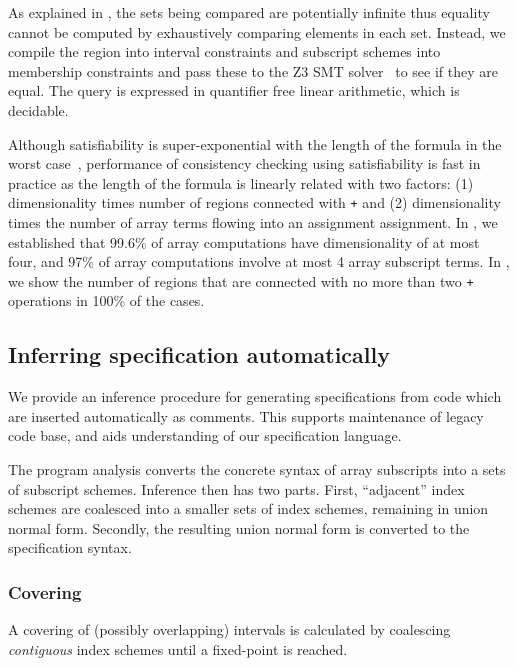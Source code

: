 As explained in , the sets being compared are
potentially infinite thus equality cannot be computed by exhaustively
comparing elements in each set. Instead, we compile the region into
interval constraints and subscript schemes into membership constraints and pass
these to the \textsc{Z3} SMT solver~\citep{de2008z3} to see if they are equal. The
query is expressed in quantifier free linear arithmetic, which is decidable.

Although satisfiability is super-exponential with the length of the formula in
the worst case~\cite{fischer1974super}, performance of consistency checking
using satisfiability is fast in practice as the length of the formula is linearly
related with two factors: (1) dimensionality times number of regions connected
with \texttt{+} and (2) dimensionality times the number of array terms flowing
into an assignment assignment. In , we
established that  99.6\% of array computations have 
dimensionality of at most four, and 97\% of array computations
involve at most 4 array subscript terms. In
, we show the number of regions that are
connected with no more than two \texttt{+} operations in 100\% of the cases.


\subsection{Inferring specification automatically}
\label{subsec:inference}
%
\noindent
We provide an inference procedure for generating specifications from
code which are inserted automatically as comments. This supports
maintenance of legacy code base, and aids understanding of our
specification language. 

The program analysis converts the concrete syntax of
array subscripts into a sets of subscript schemes. Inference then has
two parts. First, ``adjacent'' index schemes are coalesced into a
smaller sets of index schemes, remaining in union normal
form. Secondly, the resulting union normal form is converted to the
specification syntax.

\subsubsection{Covering}
A covering of (possibly overlapping) intervals is calculated
by coalescing \emph{contiguous} index schemes
until a fixed-point is reached.

